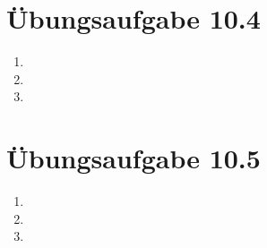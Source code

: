 \documentclass[a4paper]{scrartcl}
\begin{document}
\section*{Übungsaufgabe 10.4} 
\begin{enumerate}
    \item

    \item

    \item

\end{enumerate}

\section*{Übungsaufgabe 10.5} 
\begin{enumerate}
    \item

    \item

    \item

\end{enumerate}
\end{document}
